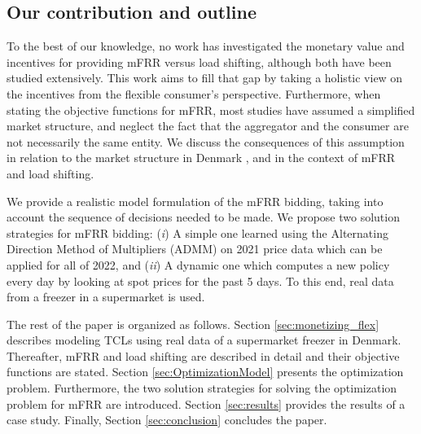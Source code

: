 \vspace{-1mm}
\subsection{Our contribution and outline}
%
To the best of our knowledge, no work has investigated the monetary value and incentives for providing mFRR versus load shifting, although both have been studied extensively. This work aims to fill that gap by taking a holistic view on the incentives from the flexible consumer's perspective. Furthermore, when stating the objective functions for mFRR, most studies have assumed a simplified market structure, and neglect the fact that the aggregator and the consumer are not necessarily the same entity. We discuss the consequences of this assumption in relation to the market structure in Denmark \cite{gade2022ecosystem}, and in the context of mFRR and load shifting.

We provide a realistic model formulation of the mFRR bidding, taking into account the sequence of decisions needed to be made. We propose two solution strategies for mFRR bidding: (\textit{i}) A simple one learned using the Alternating Direction Method of Multipliers (ADMM) on 2021 price data which can be applied for all of 2022, and (\textit{ii}) A dynamic one which computes a new policy every day by looking at spot prices for the past 5 days. To this end, real data from a freezer in a supermarket is used.


The rest of the paper is organized as follows. Section \ref{sec:monetizing_flex} describes modeling TCLs  using real data of a supermarket freezer in Denmark. Thereafter, mFRR and load shifting are described in detail and their objective functions are stated. Section \ref{sec:OptimizationModel} presents the optimization problem. Furthermore, the two solution strategies for solving the optimization problem for mFRR are introduced. Section \ref{sec:results} provides the results of a case study. Finally, Section \ref{sec:conclusion} concludes the paper.
